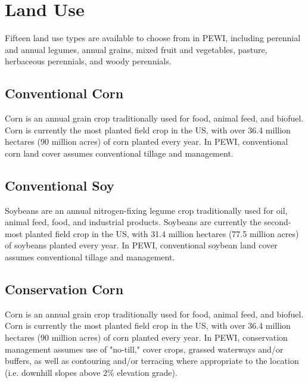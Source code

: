 \documentclass[11pt]{article}
\begin{document}
\tableofcontents
\thispagestyle{empty} %
\cleardoublepage %

\setcounter{page}{1}


\section{Land Use}\label{sec:landuse}
Fifteen land use types are available to choose from in PEWI, including perennial and annual legumes, annual grains, mixed fruit and vegetables, pasture, herbaceous perennials, and woody perennials.

\subsection{Conventional Corn}
Corn is an annual grain crop traditionally used for food, animal feed, and biofuel. Corn is currently the most planted field crop in the US, with over 36.4 million hectares (90 million acres) of corn planted every year\cite{1}.  In PEWI, conventional corn land cover assumes conventional tillage and management.

\subsection{Conventional Soy}
Soybeans are an annual nitrogen-fixing legume crop traditionally used for oil, animal feed, food, and industrial products. Soybeans are currently the second-most planted field crop in the US, with 31.4 million hectares (77.5 million acres) of soybeans planted every year\cite{2}.  In PEWI, conventional soybean land cover assumes conventional tillage and management. 

\subsection{Conservation Corn}
Corn is an annual grain crop traditionally used for food, animal feed, and biofuel. Corn is currently the most planted field crop in the US, with over 36.4 million hectares (90 million acres) of corn planted every year\cite{3}.  In PEWI, conservation management assumes use of "no-till," cover crops, grassed waterways and/or buffers, as well as contouring and/or terracing where appropriate to the location (i.e. downhill slopes above 2\% elevation grade).
\end{document}
